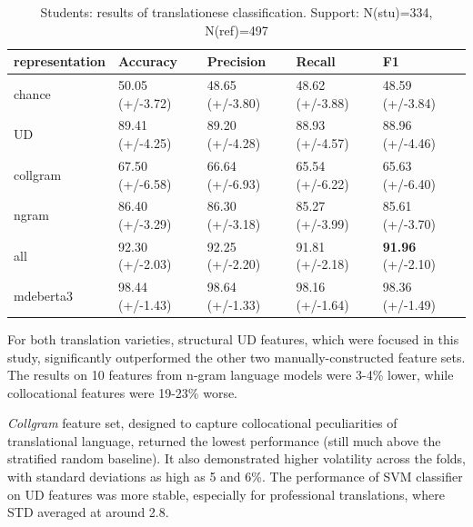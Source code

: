 \begin{table}[H]
	\begin{tabular}{l|llll}
		\toprule
		representation    & Accuracy        & Precision       & Recall          & F1              \\
		\midrule
		chance          & 50.05 (+/-3.72) & 48.65 (+/-3.80) & 48.62 (+/-3.88) & 48.59 (+/-3.84) \\
		\hline
		UD              & 89.41 (+/-4.25) & 89.20 (+/-4.28) & 88.93 (+/-4.57) & 88.96 (+/-4.46) \\
		collgram        & 67.50 (+/-6.58) & 66.64 (+/-6.93) & 65.54 (+/-6.22) & 65.63 (+/-6.40) \\
		ngram           & 86.40 (+/-3.29) & 86.30 (+/-3.18) & 85.27 (+/-3.99) & 85.61 (+/-3.70) \\
		all             & 92.30 (+/-2.03) & 92.25 (+/-2.20) & 91.81 (+/-2.18) & \textbf{91.96} (+/-2.10) \\
		\midrule
		mdeberta3  & 98.44 (+/-1.43) & 98.64 (+/-1.33) & 98.16 (+/-1.64) & \boxit{0.4in} 98.36 (+/-1.49)\\
		\bottomrule
	\end{tabular}
	\caption{\label{tab:stu-ref}Students: results of translationese classification. Support: N(stu)=334, N(ref)=497}
\end{table}

For both translation varieties, structural UD features, which were focused in this study, significantly outperformed the other two manually-constructed feature sets. The results on 10 features from n-gram language models were 3-4\% lower, while collocational features were 19-23\% worse. 

\textit{Collgram} feature set, designed to capture collocational peculiarities of translational language, returned the lowest performance (still much above the stratified random baseline). It also demonstrated higher volatility across the folds, with standard deviations as high as 5 and 6\%. The performance of SVM classifier on UD features was more stable, especially for professional translations, where STD averaged at around 2.8. 

